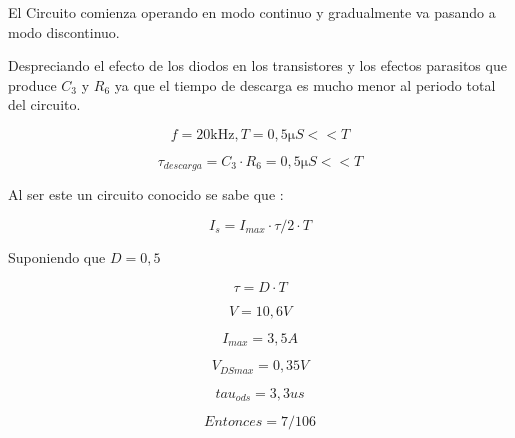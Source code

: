
El Circuito comienza operando en modo continuo y gradualmente va pasando a modo discontinuo.


Despreciando el efecto de los diodos en los transistores y los efectos parasitos que produce $C_3$ y $R_6$ ya que el tiempo de descarga es mucho menor al periodo total del circuito. 


	\begin{equation}
		f = 20 \si{\kilo\Hz} , T = 0,5 \si{\micro}S << T
	\end{equation}


	\begin{equation}
		\si{\tau}_{descarga} = C_3 \cdot R_6 = 0,5 \si{\micro}S << T
	\end{equation}

Al ser este un circuito conocido se sabe que :

\begin{equation}
 	I_s = {I_{max} \cdot \si{\tau}}/{2 \cdot T}
\end{equation}

 Suponiendo que $D= 0,5$

\begin{equation}
	\si{\tau} = D \cdot T
\end{equation}

 
\begin{equation}
 	V = 10,6 V
\end{equation}



\begin{equation}
	I_{max} = 3,5 A
\end{equation}



\begin{equation}
 	V_{DSmax} = 0,35 V
\end{equation}



\begin{equation}
	tau_{ods} = 3,3 us
\end{equation}


\begin{equation}
 	Entonces  = 7/ 106 
\end{equation}
